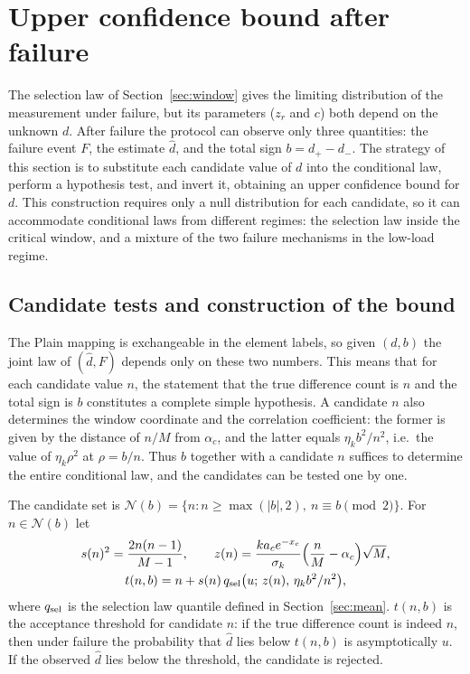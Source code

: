 \section{Upper confidence bound after failure}\label{sec:upper}
The selection law of Section~\ref{sec:window} gives the limiting distribution of the measurement under
failure, but its parameters ($z_r$ and $c$) both depend on the unknown $d$. After failure the protocol can
observe only three quantities: the failure event $F$, the estimate $\widehat d$, and the total sign
$b = d_+ - d_-$. The strategy of this section is to substitute each candidate value of $d$ into the
conditional law, perform a hypothesis test, and invert it, obtaining an upper confidence bound for $d$.
This construction requires only a null distribution for each candidate, so it can accommodate conditional
laws from different regimes: the selection law inside the critical window, and a mixture of the two
failure mechanisms in the low-load regime.

\subsection{Candidate tests and construction of the bound}\label{sec:upper-construct}
The Plain mapping is exchangeable in the element labels, so given $(d, b)$ the joint law of
$(\widehat d, F)$ depends only on these two numbers. This means that for each candidate value $n$, the
statement that the true difference count is $n$ and the total sign is $b$ constitutes a complete simple
hypothesis. A candidate $n$ also determines the window coordinate and the correlation coefficient: the
former is given by the distance of $n/M$ from $\alpha_c$, and the latter equals $\eta_k b^2/n^2$, i.e.\ the
value of $\eta_k\rho^2$ at $\rho = b/n$. Thus $b$ together with a candidate $n$ suffices to determine the
entire conditional law, and the candidates can be tested one by one.

The candidate set is
$\mathcal N(b) = \{n : n \ge \max(|b|, 2),\ n \equiv b \pmod 2\}$. For
$n \in \mathcal N(b)$ let
\begin{gather*}
s(n)^2 = \frac{2n(n-1)}{M-1},\qquad
z(n) = \frac{ka_ce^{-x_c}}{\sigma_k}\Bigl(\frac nM -
\alpha_c\Bigr)\sqrt M,\\
t(n,b) = n + s(n)\,q_{\rm sel}\bigl(u;\,z(n),\,\eta_k b^2/n^2\bigr),
\end{gather*}
where $q_{\rm sel}$ is the selection law quantile defined in Section~\ref{sec:mean}.
$t(n,b)$ is the acceptance threshold for candidate $n$: if the true difference count is indeed $n$, then
under failure the probability that $\widehat d$ lies below $t(n,b)$ is asymptotically $u$. If the observed
$\widehat d$ lies below the threshold, the candidate is rejected.

